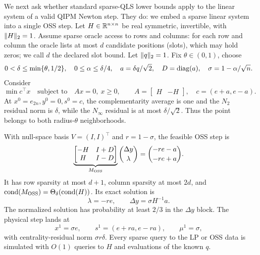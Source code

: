 We next ask whether standard sparse-QLS lower bounds apply to the linear system of a valid QIPM Newton
step.  They do: we embed a sparse linear system into a single OSS step.  Let
$H\in\mathbb{R}^{n\times n}$ be real symmetric, invertible, with $\lVert H\rVert_2=1$.
Assume sparse oracle access to rows and columns: for each row and column the
oracle lists at most $d$ candidate positions (slots), which may hold zeros;
we call $d$ the declared slot bound.  Let $\lVert q\rVert_2=1$.  Fix $\theta\in(0,1)$, choose
\begin{equation}
 0<\delta\leq\min\{\theta,1/2\},\quad
 0\leq\alpha\leq\delta/4,\quad
 a=\delta q/\sqrt2,\quad D=\operatorname{diag}(a),\quad
 \sigma=1-\alpha/\sqrt n.                                \label{eq:structural-oss-parameters}
\end{equation}
Consider
\begin{equation}
 \min c^\top x\quad\text{subject to}\quad
 Ax=0,\ x\geq0,\qquad
 A=\begin{bmatrix}H&-H\end{bmatrix},\quad c=(e+a,e-a).    \label{eq:structural-oss-lp}
\end{equation}
At $x^0=e_{2n},y^0=0,s^0=c$, the complementarity average is one and the
$N_2$ residual norm is $\delta$, while the $N_\infty$ residual is at most
$\delta/\sqrt2$.  Thus the point belongs to both radius-$\theta$
neighborhoods.

\begin{theorem}
\label{thm:structural-oss-embedding}
With null-space basis $V=(I,I)^\top$ and $r=1-\sigma$, the feasible OSS step is
\begin{equation}
 \underbrace{\begin{bmatrix}-H&I+D\\H&I-D\end{bmatrix}}_{M_{\rm OSS}}
 \binom{\Delta y}{\lambda}
 =\binom{-re-a}{-re+a}.                                  \label{eq:structural-oss-system}
\end{equation}
It has row sparsity at most $d+1$, column sparsity at most $2d$, and
$\operatorname{cond}(M_{\rm OSS})=\Theta_\delta(\operatorname{cond}(H))$.  Its exact solution is
\begin{equation}
 \lambda=-re,\qquad \Delta y=\sigma H^{-1}a.             \label{eq:structural-oss-solution}
\end{equation}
The normalized solution has probability at least $2/3$ in the $\Delta y$
block.  The physical step lands at
\begin{equation}
 x^1=\sigma e,\qquad s^1=(e+ra,e-ra),\qquad \mu^1=\sigma,
                                                               \label{eq:structural-oss-endpoint}
\end{equation}
with centrality-residual norm $\sigma r\delta$.  Every sparse query to the
LP or OSS data is simulated with $O(1)$ queries to $H$ and evaluations of the
known $q$.
\end{theorem}

